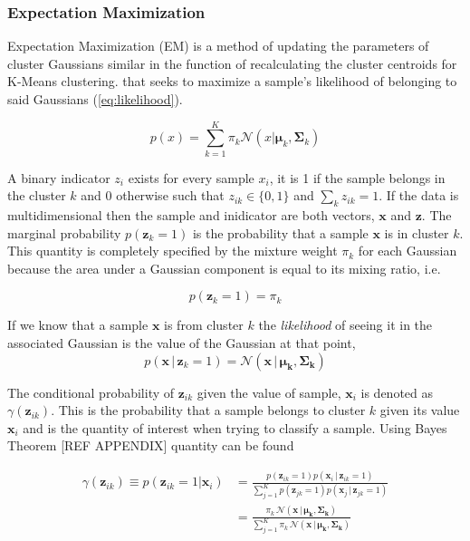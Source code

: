 \subsubsection{Expectation Maximization}

Expectation Maximization (EM) is a method of updating the parameters of cluster Gaussians similar in the function of recalculating the cluster centroids for K-Means clustering. that seeks to maximize a sample's likelihood of belonging to said Gaussians (\ref{eq:likelihood}). 

\begin{equation}
\label{eq:likelihood}
p(x) = \sum^K_{k=1} \pi_k \mathcal{N}(x|\bm{\mu}_k, \bm{\Sigma}_k)
\end{equation}

A binary indicator $z_{i}$ exists for every sample $x_i$, it is 1 if the sample belongs in the cluster $k$ and 0 otherwise such that $z_{ik} \in \{0, 1\}$ and $\sum_k z_{ik} = 1$. If the data is multidimensional then the sample and inidicator are both vectors, $\bm{x}$ and $\bm{z}$. The marginal probability $p(\bm{z}_{k} = 1)$ is the probability that a sample $\bm{x}$ is in cluster $k$. This quantity is completely specified by the mixture weight $\pi_k$ for each Gaussian because the area under a Gaussian component is equal to its mixing ratio, i.e.

\begin{equation}
	\label{eq:marginalk}
	p(\bm{z}_{k}=1) = \pi_k 
\end{equation}
	
If we know that a sample $\bm{x}$ is from cluster $k$ the \emph{likelihood} of seeing it in the associated Gaussian is the value of the Gaussian at that point,
\begin{equation}
	\label{eq:cond}
	p(\bm{x}\, |\, \bm{z}_{k} = 1) = \mathcal{N}(\bm{x}\, |\,\bm{\mu_k}, \bm{\Sigma_k})
\end{equation}

The conditional probability of $\bm{z}_{ik}$ given the value of sample, $\bm{x}_i$ is denoted as $\gamma(\bm{z}_{ik})$. This is the probability that a sample belongs to cluster $k$ given its value $\bm{x}_i$ and is the quantity of interest when trying to classify a sample.  Using Bayes Theorem [REF APPENDIX] quantity can be found 

\begin{align}
	\gamma(\bm{z}_{ik}) \equiv p(\bm{z}_{ik} =1 | \bm{x}_i)
	\label{eq:gamma2}
	&= \frac{p(\bm{z}_{ik}=1)p(\bm{x}_i\, |\, \bm{z}_{ik} = 1)}{\sum^K_{j=1}p(\bm{z}_{jk}=1)p(\bm{x}_j\, |\, \bm{z}_{jk} = 1)}\\ 
	\label{eq:gamma3}
	&= \frac{\pi_k\, \mathcal{N}(\bm{x}\,|\,\bm{\mu_k},\bm{\Sigma_k})}{\sum_{j=1}^{K}\pi_k\, \mathcal{N}(\bm{x}\,|\,\bm{\mu_k},\bm{\Sigma_k})}
\end{align}


